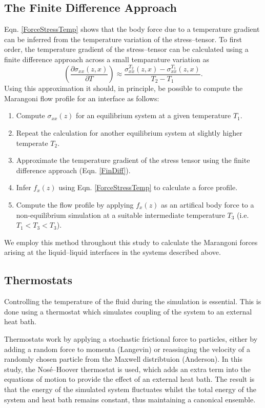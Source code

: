 \subsection{The Finite Difference Approach}
Eqn. \ref{ForceStressTemp} shows that the body force due to a temperature gradient can be inferred from the temperature variation of the stress--tensor. 
To first order, the temperature gradient of the stress--tensor can be calculated using a finite difference approach across a small temparature variation as
\begin{equation}
\label{FinDiff}
\left( \frac{\partial \sigma_{xx}(z,x)}{\partial T} \right) \approx \frac{\sigma_{xx}^{T_{2}}(z,x) - \sigma_{xx}^{T_{1}}(z,x)}{T_{2} - T_{1}}.
\end{equation}
Using this approximation it should, in principle, be possible to compute the Marangoni flow profile for an interface as follows:
\begin{enumerate}
	\item Compute $\sigma_{xx}(z)$ for an equilibrium system at a given temperature $T_{1}$.
	\item Repeat the calculation for another equilibrium system at slightly higher temperate $T_{2}$.
	\item Approximate the temperature gradient of the stress tensor using the finite difference approach (Eqn. \ref{FinDiff}).
	\item Infer $f_{x}(z)$ using Eqn. \ref{ForceStressTemp} to calculate a force profile.
	\item Compute the flow profile by applying $f_{x}(z)$ as an artifical body force to a non-equilibrium simulation at a suitable intermediate temperature $T_{3}$ (i.e. $T_{1} < T_{3} < T_{3}$).
\end{enumerate}

We employ this method throughout this study to calculate the Marangoni forces arising at the liquid--liquid interfaces in the systems described above.

\subsection{Thermostats}
Controlling the temperature of the fluid during the simulation is essential.
This is done using a thermostat which simulates coupling of the system to an external heat bath.

Thermostats work by applying a stochastic frictional force to particles, either by adding a random force to momenta (Langevin)\cite{Langevin} or reassinging the velocity of a randomly chosen particle from the Maxwell distribtuion (Anderson)\cite{AndersonTherm}.
In this study, the Nos\'{e}--Hoover thermostat is used, which adds an extra term into the equations of motion to provide the effect of an external heat bath.\cite{NoseHoover1, NoseHoover2, NoseHoover3}
The result is that the energy of the simulated system fluctuates whilst the total energy of the system and heat bath remains constant, thus maintaining a canonical ensemble.

